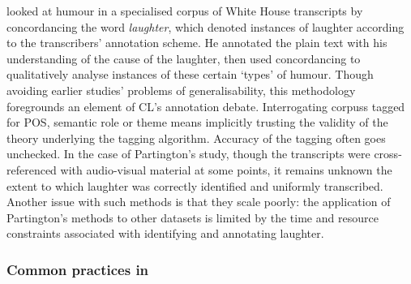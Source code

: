 \textcite{partington_double-speak_2011} looked at humour in a specialised \gls{corpus} of White House transcripts by concordancing the word \emph{laughter}, which denoted instances of laughter according to the transcribers' annotation scheme. He annotated the plain text with his understanding of the cause of the laughter, then used concordancing to qualitatively analyse instances of these certain `types' of humour. Though avoiding earlier studies' problems of generalisability, this methodology foregrounds an element of \gls{CL}'s annotation debate. Interrogating \glspl{corpus} tagged for \gls{POS}, semantic role or theme means implicitly trusting the validity of the theory underlying the tagging algorithm. Accuracy of the tagging often goes unchecked. In the case of Partington's study, though the transcripts were cross\hyp{}referenced with audio\hyp{}visual material at some points, it remains unknown the extent to which laughter was correctly identified and uniformly transcribed. Another issue with such methods is that they scale poorly: the application of Partington's methods to other datasets is limited by the time and resource constraints associated with identifying and annotating laughter.


\subsubsection{Common practices in } \label{sect:compraccads}


